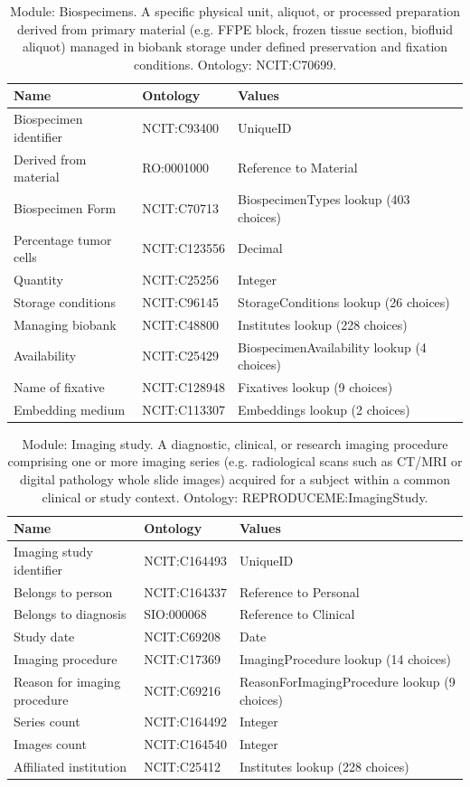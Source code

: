 \documentclass{article}
\begin{document}
\begin{table}[htb]
\begin{tabular}{lll}
Name & Ontology & Values \\
\hline
Biospecimen identifier & NCIT:C93400 & UniqueID \\
Derived from material & RO:0001000 & Reference to Material \\
Biospecimen Form & NCIT:C70713 & BiospecimenTypes lookup (403 choices) \\
Percentage tumor cells & NCIT:C123556 & Decimal \\
Quantity & NCIT:C25256 & Integer \\
Storage conditions & NCIT:C96145 & StorageConditions lookup (26 choices) \\
Managing biobank & NCIT:C48800 & Institutes lookup (228 choices) \\
Availability & NCIT:C25429 & BiospecimenAvailability lookup (4 choices) \\
Name of fixative & NCIT:C128948 & Fixatives lookup (9 choices) \\
Embedding medium & NCIT:C113307 & Embeddings lookup (2 choices) \\
\hline
\end{tabular}
\caption[Module: Biospecimens]{\label{table:table8} Module: Biospecimens. A specific physical unit, aliquot, or processed preparation derived from primary material (e.g. FFPE block, frozen tissue section, biofluid aliquot) managed in biobank storage under defined preservation and fixation conditions. Ontology: NCIT:C70699. }
\end{table}

\begin{table}[htb]
\begin{tabular}{lll}
Name & Ontology & Values \\
\hline
Imaging study identifier & NCIT:C164493 & UniqueID \\
Belongs to person & NCIT:C164337 & Reference to Personal \\
Belongs to diagnosis & SIO:000068 & Reference to Clinical \\
Study date & NCIT:C69208 & Date \\
Imaging procedure & NCIT:C17369 & ImagingProcedure lookup (14 choices) \\
Reason for imaging procedure & NCIT:C69216 & ReasonForImagingProcedure lookup (9 choices) \\
Series count & NCIT:C164492 & Integer \\
Images count & NCIT:C164540 & Integer \\
Affiliated institution & NCIT:C25412 & Institutes lookup (228 choices) \\
\hline
\end{tabular}
\caption[Module: Imaging study]{\label{table:table9} Module: Imaging study. A diagnostic, clinical, or research imaging procedure comprising one or more imaging series (e.g. radiological scans such as CT/MRI or digital pathology whole slide images) acquired for a subject within a common clinical or study context. Ontology: REPRODUCEME:ImagingStudy. }
\end{table}
\end{document}
